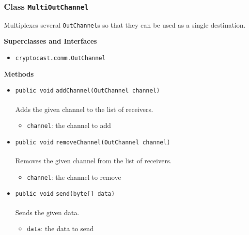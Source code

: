 \subsubsection{Class \lstinline|MultiOutChannel|}
Multiplexes several \lstinline|OutChannel|s so that they can be used as a single
 destination. \\
\noindent\begin{minipage}[t]{5cm}
\vspace{0.3em}
\hspace*{2em}
\vspace{0.3em}
\end{minipage}



\textbf{\sffamily Superclasses and Interfaces}
\begin{itemize}
\item \lstinline|cryptocast.comm.OutChannel|
\end{itemize}



\textbf{\sffamily Methods}
\begin{itemize}
\item \lstinline|public void| \lstinline|addChannel|\lstinline|(OutChannel channel)|\\ \\[-0.6em]
Adds the given channel to the list of receivers.
\begin{itemize}
\item \lstinline|channel|: the channel to add
\end{itemize}



\item \lstinline|public void| \lstinline|removeChannel|\lstinline|(OutChannel channel)|\\ \\[-0.6em]
Removes the given channel from the list of receivers.
\begin{itemize}
\item \lstinline|channel|: the channel to remove
\end{itemize}



\item \lstinline|public void| \lstinline|send|\lstinline|(byte[] data)|\\ \\[-0.6em]
Sends the given data.
\begin{itemize}
\item \lstinline|data|: the data to send
\end{itemize}



\end{itemize}

